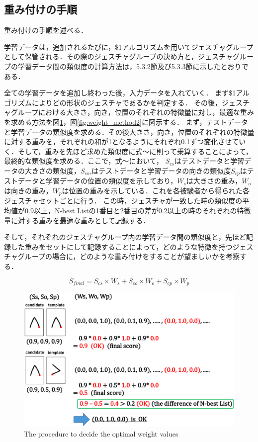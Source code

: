 \subsection{重み付けの手順}
重み付けの手順を述べる．

学習データは，追加されるたびに，\$1アルゴリズムを用いてジェスチャグループとして保管される．その際のジェスチャグループの決め方と，ジェスチャグループの学習データ間の類似度の計算方法は，5.3.2節及び5.3.3節に示したとおりである．

全ての学習データを追加し終わった後，入力データを入れていく．
まず\$1アルゴリズムによりどの形状のジェスチャであるかを判定する．
その後，ジェスチャグループにおける大きさ，向き，位置のそれぞれの特徴量に対し，最適な重みを求める方法を図\ref{fig:weight_method1}，図\ref{fig:weight_method2}に図示する．
まず，テストデータと学習データの類似度を求める．その後大きさ，向き，位置のそれぞれの特徴量に対する重みを，それぞれの和が1となるようにそれぞれ0.1ずつ変化させていく．そして，重みを先ほど求めた類似度に式〜に則って乗算することによって，最終的な類似度を求める．ここで，式〜において， $S_\textit{cs}$はテストデータと学習データの大きさの類似度，$S_\textit{co}$,はテストデータと学習データの向きの類似度$S_\textit{cp}$はテストデータと学習データの位置の類似度を示しており，$W_\textit{s}$は大きさの重み，$W_\textit{o}$は向きの重み，$W_\textit{p}$は位置の重みを示している．これを各被験者から得られた各ジェスチャセットごとに行う．
この時，ジェスチャが一致した時の類似度の平均値が0.9以上，N-best Listの1番目と2番目の差が0.2以上の時のそれぞれの特徴量に対する重みを最適な重みとして記録する．

そして，それぞれのジェスチャグループ内の学習データ間の類似度と，先ほど記録した重みをセットにして記録することによって，どのような特徴を持つジェスチャグループの場合に，どのような重み付けをすることが望ましいかを考察する．

\begin{equation}
S_\textit{final} = S_\textit{cs} \times W_\textit{s} + S_\textit{co} \times W_\textit{o} + S_\textit{cp} \times W_\textit{p}
\end{equation}

\begin{figure} [h!]
	\begin{center}
		\includegraphics [width=0.8\hsize ]{img/weight_method1.eps}
	\end{center}
	\caption{The procedure to decide the optimal weight values }
	\label{fig:weight_method1}
\end{figure}

